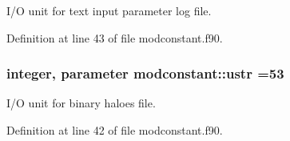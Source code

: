 I/O unit for text input parameter log file. 



Definition at line 43 of file modconstant.\+f90.

\subsubsection[{\texorpdfstring{ustr}{ustr}}]{\setlength{\rightskip}{0pt plus 5cm}integer, parameter modconstant\+::ustr =53}\hypertarget{namespacemodconstant_a7ad4db4111cceef61b48e40126488f2d}{}\label{namespacemodconstant_a7ad4db4111cceef61b48e40126488f2d}


I/O unit for binary haloes file. 



Definition at line 42 of file modconstant.\+f90.

